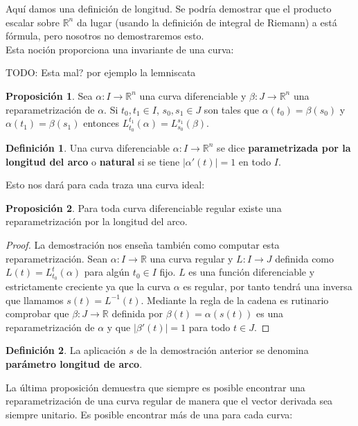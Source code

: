 \documentclass{article}
\theoremstyle{definition}
\newtheorem{prop}{Proposición}
\newtheorem{define}{Definición}
\newcommand{\reales}{\mathbb{R}}
\begin{document}
Aquí damos una definición de longitud. Se podría demostrar que el producto escalar sobre $\reales^{n}$ da lugar (usando la definición de integral de Riemann) a está fórmula, pero nosotros no demostraremos esto.\\ 
Esta noción proporciona una invariante de una curva:

TODO: Esta mal? por ejemplo la lemniscata
\begin{prop}
	Sea $\alpha: I \rightarrow \reales^{n}$ una curva diferenciable y $\beta: J \rightarrow \reales^{n}$ una reparametrización de $\alpha$. Si $t_0, t_1 \in I$, $s_0, s_1 \in J$ son tales que $\alpha(t_0) = \beta(s_0)$ y $\alpha(t_1) = \beta(s_1)$ entonces $L_{t_0}^{t_1} (\alpha) = L_{s_0}^{s_1} (\beta)$.
\end{prop}

\begin{define}
	Una curva diferenciable $\alpha: I \rightarrow \reales^{n}$ se dice \textbf{parametrizada por la longitud del arco} o \textbf{natural} si se tiene $|\alpha' (t)| = 1$ en todo $I$.
\end{define}

Esto nos dará para cada traza una curva ideal:

\begin{prop}\label{prop_arco_param}
	Para toda curva diferenciable regular existe una reparametrización por la longitud del arco.
\end{prop}

\begin{proof}
	La demostración nos enseña también como computar esta reparametrización. Sean $\alpha : I \rightarrow \reales$ una curva regular y $L : I \rightarrow J$ definida como $L(t) = L_{t_0}^{t}(\alpha)$ para algún $t_0 \in I$ fijo. $L$ es una función diferenciable y estrictamente creciente ya que la curva $\alpha$ es regular, por tanto tendrá una inversa que llamamos $s(t) = L^{-1} (t)$. Mediante la regla de la cadena es rutinario comprobar que $\beta : J \rightarrow \reales$ definida por $\beta(t) = \alpha(s(t))$ es una reparametrización de $\alpha$ y que $|\beta'(t)| = 1$ para todo $t \in J$.
\end{proof}

\begin{define}
	La aplicación $s$ de la demostración anterior se denomina \textbf{parámetro longitud de arco}.
\end{define}

La última proposición demuestra que siempre es posible encontrar una reparametrización de una curva regular de manera que el vector derivada sea siempre unitario. Es posible encontrar más de una para cada curva:
\end{document}
